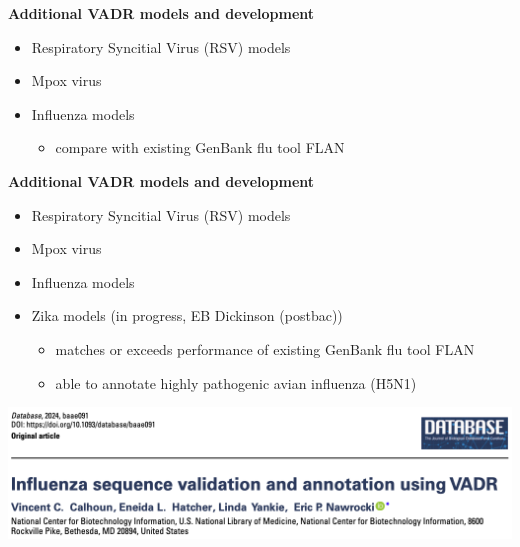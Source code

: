 \documentclass[landscape]{slides}
\begin{document}
\begin{slide}
\begin{center}
  \textbf{Additional VADR models and development}
\end{center}

  \begin{itemize}
  \item Respiratory Syncitial Virus (RSV) models
  \item Mpox virus 
  \item Influenza models
    \begin{itemize}
      \item compare with existing GenBank flu tool FLAN
    \end{itemize}
  \end{itemize}

  \vfill
\end{slide}
\begin{slide}
\begin{center}
  \textbf{Additional VADR models and development}
\end{center}

  \begin{itemize}
  \item Respiratory Syncitial Virus (RSV) models
  \item Mpox virus 
  \item Influenza models
  \item Zika models (in progress, EB Dickinson (postbac))
    \begin{itemize}
      \item matches or exceeds performance of existing GenBank flu tool FLAN
      \item able to annotate highly pathogenic avian influenza (H5N1)
    \end{itemize}
  \end{itemize}
\includegraphics[width=10.5in]{figs/vadr-flu-paper}

  \vfill
\end{slide}
\end{document}
